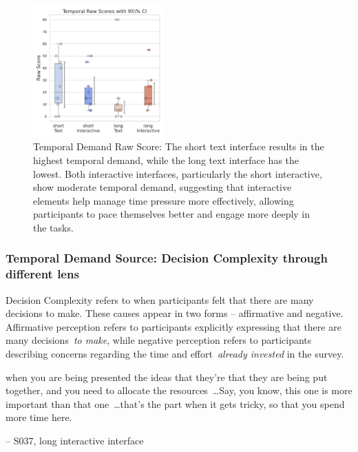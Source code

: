 \begin{figure} %
    \centering
    \includegraphics[width=0.45\textwidth, trim=0 13 0 13, clip]{content/image/cog/Temporal_scores.pdf}
    \captionsetup{width=0.40\textwidth, justification=justified} %
    \caption{Temporal Demand Raw Score: The short text interface results in the highest temporal demand, while the long text interface has the lowest. Both interactive interfaces, particularly the short interactive, show moderate temporal demand, suggesting that interactive elements help manage time pressure more effectively, allowing participants to pace themselves better and engage more deeply in the tasks.}
    \label{fig:temporal_cog_score}
\end{figure}

\subsubsection{Temporal Demand Source: Decision Complexity through different lens}
Decision Complexity refers to when participants felt that there are many decisions to make. These causes appear in two forms -- affirmative and negative. Affirmative perception refers to participants explicitly expressing that there are many decisions~\textit{to make}, while negative perception refers to participants describing concerns regarding the time and effort~\textit{already invested} in the survey.

\begin{displayquote}
\bracketellipsis when you are being presented the ideas that they're that they are being put together, and you need to allocate the resources~\ldots Say, you know, this one is more important than that one~\ldots that's the part when it gets tricky, so that you spend more time here. 
    
\noindent \hfill -- S037, long interactive interface
\end{displayquote}

